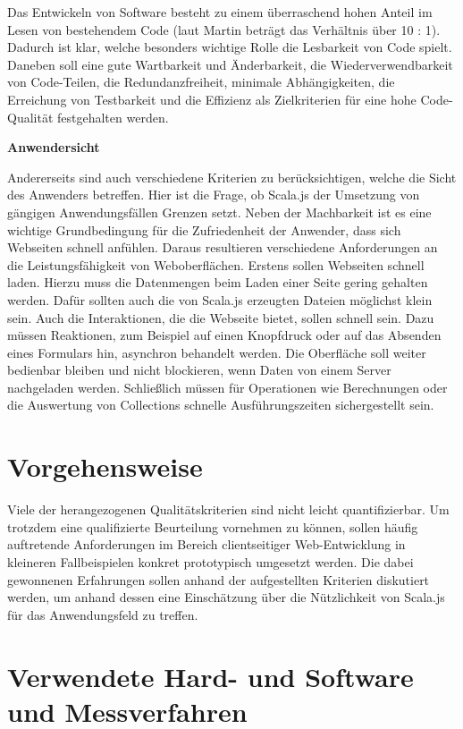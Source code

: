 \documentclass[a4paper, 12pt, hidelinks, listof=totoc, listoftables=totoc, bibliography=totoc]{scrreprt}
\newcommand{\MyMiniSec}[1]{\rmfamily\fontsize{12}{15}\selectfont
	\vspace{7pt}\textbf{#1} %
}
\begin{document}
Das Entwickeln von Software besteht zu einem überraschend hohen Anteil im Lesen von bestehendem Code (laut Martin beträgt das Verhältnis über 10 : 1)\cite[S. 42]{martin2009.CCH}. Dadurch ist klar, welche besonders wichtige Rolle die Lesbarkeit von Code spielt. Daneben soll eine gute Wartbarkeit und Änderbarkeit, die Wiederverwendbarkeit von Code-Teilen, die Redundanzfreiheit, minimale Abhängigkeiten, die Erreichung von Testbarkeit und die Effizienz als Zielkriterien für eine hohe Code-Qualität festgehalten werden.

\MyMiniSec{Anwendersicht}

Andererseits sind auch verschiedene Kriterien zu berücksichtigen, welche die Sicht des Anwenders betreffen. Hier ist die Frage, ob Scala.js der Umsetzung von gängigen Anwendungsfällen Grenzen setzt. Neben der Machbarkeit ist es eine wichtige Grundbedingung für die Zufriedenheit der Anwender, dass sich Webseiten schnell anfühlen. Daraus resultieren verschiedene Anforderungen an die Leistungsfähigkeit von Weboberflächen. Erstens sollen Webseiten schnell laden. Hierzu muss die Datenmengen beim Laden einer Seite gering gehalten werden. Dafür sollten auch die von Scala.js erzeugten Dateien möglichst klein sein. Auch die Interaktionen, die die Webseite bietet, sollen schnell sein. Dazu müssen Reaktionen, zum Beispiel auf einen Knopfdruck oder auf das Absenden eines Formulars hin, asynchron behandelt werden. Die Oberfläche soll weiter bedienbar bleiben und nicht blockieren, wenn Daten von einem Server nachgeladen werden. Schließlich müssen für Operationen wie Berechnungen oder die Auswertung von Collections schnelle Ausführungszeiten sichergestellt sein.


\section{Vorgehensweise}

Viele der herangezogenen Qualitätskriterien sind nicht leicht quantifizierbar. Um trotzdem eine qualifizierte Beurteilung vornehmen zu können, sollen häufig auftretende Anforderungen im Bereich clientseitiger Web-Entwicklung in kleineren Fallbeispielen konkret prototypisch umgesetzt werden. Die dabei gewonnenen Erfahrungen sollen anhand der aufgestellten Kriterien diskutiert werden, um anhand dessen eine Einschätzung über die Nützlichkeit von Scala.js für das Anwendungsfeld zu treffen.


\section{Verwendete Hard- und Software und Messverfahren}
\end{document}
